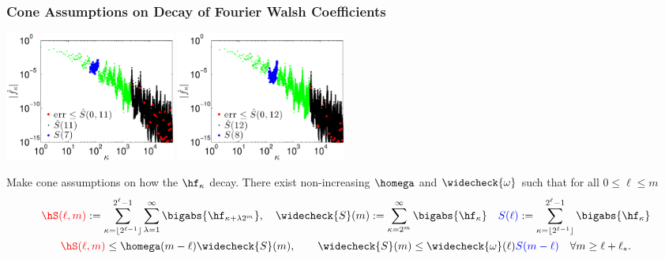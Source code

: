 \documentclass[10pt,compress]{beamer} %
\newcommand{\wcS}{\widecheck{S}}
\newcommand{\wcomega}{\widecheck{\omega}}
\begin{document}
\begin{frame}\frametitle{Cone Assumptions on Decay of Fourier Walsh Coefficients}
\begin{center}
\includegraphics[width=5.6cm]{ProgramsImages/PlotFWTCoefUse128.eps} \quad
\includegraphics[width=5.6cm]{ProgramsImages/PlotFWTCoefUse256.eps} \quad
\end{center}
\vspace{-3ex}
Make \alert{cone} assumptions on how the $\hf_{\kappa}$ decay.  There exist non-increasing $\homega$ and $\wcomega$ such that for all $0 \le \ell \le m$
\vspace{-1ex}
\begin{gather*}
{\color{red}\hS(\ell,m)}  := \sum_{\kappa=\lfloor 2^{\ell-1} \rfloor}^{2^{\ell}-1} \sum_{\lambda=1}^{\infty} \bigabs{ \hf_{\kappa+\lambda 2^{m}}}, \quad
\wcS(m) :=
\sum_{\kappa=2^{m}}^{\infty} \bigabs{\hf_{\kappa}} \quad 
{\color{blue}S(\ell)} :=  \sum_{\kappa=\lfloor 2^{\ell-1} \rfloor}^{2^{\ell}-1} \bigabs{\hf_{\kappa}}\\
{\color{red}\hS(\ell,m)} \le \homega(m-\ell) \wcS(m), \qquad 
\wcS(m) \le \wcomega(\ell) {\color{blue}S(m-\ell)} \quad \forall m \ge \ell+\ell_*.
\end{gather*}
\end{frame}
\end{document}
